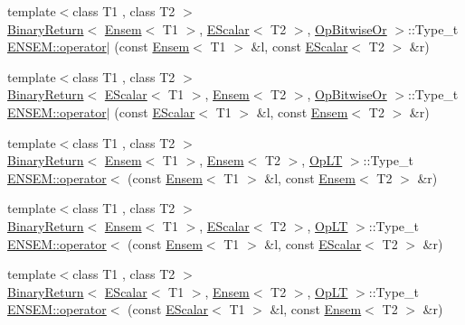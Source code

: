 \begin{DoxyCompactItemize}
{\footnotesize template$<$class T1 , class T2 $>$ }\\\mbox{\hyperlink{structENSEM_1_1BinaryReturn}{Binary\+Return}}$<$ \mbox{\hyperlink{classENSEM_1_1Ensem}{Ensem}}$<$ T1 $>$, \mbox{\hyperlink{classENSEM_1_1EScalar}{E\+Scalar}}$<$ T2 $>$, \mbox{\hyperlink{structENSEM_1_1OpBitwiseOr}{Op\+Bitwise\+Or}} $>$\+::Type\+\_\+t \mbox{\hyperlink{group__eensem_gadd9d57d20a2060d811fba3899bcfcd73}{E\+N\+S\+E\+M\+::operator$\vert$}} (const \mbox{\hyperlink{classENSEM_1_1Ensem}{Ensem}}$<$ T1 $>$ \&l, const \mbox{\hyperlink{classENSEM_1_1EScalar}{E\+Scalar}}$<$ T2 $>$ \&r)
\item 
{\footnotesize template$<$class T1 , class T2 $>$ }\\\mbox{\hyperlink{structENSEM_1_1BinaryReturn}{Binary\+Return}}$<$ \mbox{\hyperlink{classENSEM_1_1EScalar}{E\+Scalar}}$<$ T1 $>$, \mbox{\hyperlink{classENSEM_1_1Ensem}{Ensem}}$<$ T2 $>$, \mbox{\hyperlink{structENSEM_1_1OpBitwiseOr}{Op\+Bitwise\+Or}} $>$\+::Type\+\_\+t \mbox{\hyperlink{group__eensem_gacc25f74aa29769c6afffde4164c7821c}{E\+N\+S\+E\+M\+::operator$\vert$}} (const \mbox{\hyperlink{classENSEM_1_1EScalar}{E\+Scalar}}$<$ T1 $>$ \&l, const \mbox{\hyperlink{classENSEM_1_1Ensem}{Ensem}}$<$ T2 $>$ \&r)
\item 
{\footnotesize template$<$class T1 , class T2 $>$ }\\\mbox{\hyperlink{structENSEM_1_1BinaryReturn}{Binary\+Return}}$<$ \mbox{\hyperlink{classENSEM_1_1Ensem}{Ensem}}$<$ T1 $>$, \mbox{\hyperlink{classENSEM_1_1Ensem}{Ensem}}$<$ T2 $>$, \mbox{\hyperlink{structENSEM_1_1OpLT}{Op\+LT}} $>$\+::Type\+\_\+t \mbox{\hyperlink{group__eensem_ga1d5f68e8b9ac25bf882bfdfda50cf24b}{E\+N\+S\+E\+M\+::operator$<$}} (const \mbox{\hyperlink{classENSEM_1_1Ensem}{Ensem}}$<$ T1 $>$ \&l, const \mbox{\hyperlink{classENSEM_1_1Ensem}{Ensem}}$<$ T2 $>$ \&r)
\item 
{\footnotesize template$<$class T1 , class T2 $>$ }\\\mbox{\hyperlink{structENSEM_1_1BinaryReturn}{Binary\+Return}}$<$ \mbox{\hyperlink{classENSEM_1_1Ensem}{Ensem}}$<$ T1 $>$, \mbox{\hyperlink{classENSEM_1_1EScalar}{E\+Scalar}}$<$ T2 $>$, \mbox{\hyperlink{structENSEM_1_1OpLT}{Op\+LT}} $>$\+::Type\+\_\+t \mbox{\hyperlink{group__eensem_ga4f6f9b0944034ade90afab94b38db470}{E\+N\+S\+E\+M\+::operator$<$}} (const \mbox{\hyperlink{classENSEM_1_1Ensem}{Ensem}}$<$ T1 $>$ \&l, const \mbox{\hyperlink{classENSEM_1_1EScalar}{E\+Scalar}}$<$ T2 $>$ \&r)
\item 
{\footnotesize template$<$class T1 , class T2 $>$ }\\\mbox{\hyperlink{structENSEM_1_1BinaryReturn}{Binary\+Return}}$<$ \mbox{\hyperlink{classENSEM_1_1EScalar}{E\+Scalar}}$<$ T1 $>$, \mbox{\hyperlink{classENSEM_1_1Ensem}{Ensem}}$<$ T2 $>$, \mbox{\hyperlink{structENSEM_1_1OpLT}{Op\+LT}} $>$\+::Type\+\_\+t \mbox{\hyperlink{group__eensem_ga32b783bbc9759bd7ae2cbaa1f757f87d}{E\+N\+S\+E\+M\+::operator$<$}} (const \mbox{\hyperlink{classENSEM_1_1EScalar}{E\+Scalar}}$<$ T1 $>$ \&l, const \mbox{\hyperlink{classENSEM_1_1Ensem}{Ensem}}$<$ T2 $>$ \&r)

\end{DoxyCompactItemize}
